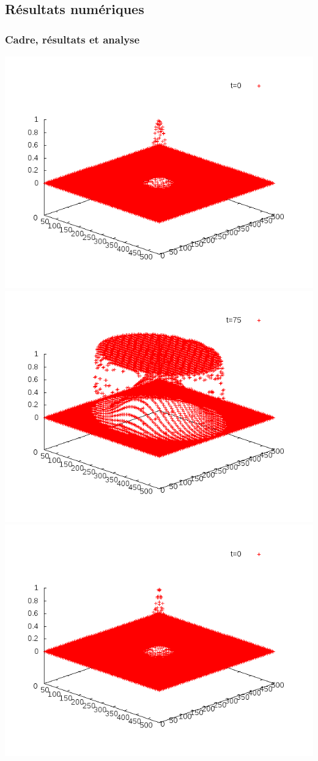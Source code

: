 \documentclass[handout]{beamer}
\begin{document}
\subsection[Résultats]{Résultats numériques}
\begin{frame}
	\frametitle{Cadre, résultats et analyse}
	\includegraphics[scale=0.2]{img/anim1-10-1.png}
	\includegraphics[scale=0.2]{img/anim1-10-150.png}\\
	\includegraphics[scale=0.2]{img/anim1-80-1.png}

\end{frame}
\end{document}
